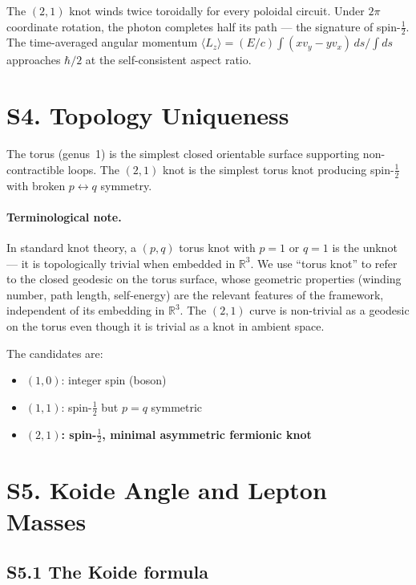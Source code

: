 \documentclass[11pt,a4paper]{article}
\begin{document}
The $(2,1)$ knot winds twice toroidally for every poloidal circuit. Under $2\pi$ coordinate rotation, the photon completes half its path --- the signature of spin-$\tfrac{1}{2}$. The time-averaged angular momentum $\langle L_z \rangle = (E/c) \int(xv_y - yv_x)\,ds / \int ds$ approaches $\hbar/2$ at the self-consistent aspect ratio.

\section{S4. Topology Uniqueness}
\label{sec:S4}

The torus (genus~1) is the simplest closed orientable surface supporting non-contractible loops. The $(2,1)$ knot is the simplest torus knot producing spin-$\tfrac{1}{2}$ with broken $p\leftrightarrow q$ symmetry.

\paragraph{Terminological note.} In standard knot theory, a $(p,q)$ torus knot with $p=1$ or $q=1$ is the unknot --- it is topologically trivial when embedded in $\mathbb{R}^3$. We use ``torus knot'' to refer to the closed geodesic on the torus surface, whose geometric properties (winding number, path length, self-energy) are the relevant features of the framework, independent of its embedding in $\mathbb{R}^3$. The $(2,1)$ curve is non-trivial as a geodesic on the torus even though it is trivial as a knot in ambient space.

The candidates are:
\begin{itemize}
  \item $(1,0)$: integer spin (boson)
  \item $(1,1)$: spin-$\tfrac{1}{2}$ but $p=q$ symmetric
  \item \textbf{$(2,1)$: spin-$\frac{1}{2}$, minimal asymmetric fermionic knot}
\end{itemize}

\section{S5. Koide Angle and Lepton Masses}
\label{sec:S5}

\subsection{S5.1 The Koide formula}
\end{document}
